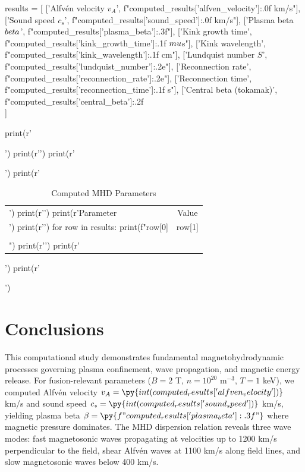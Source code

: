 \documentclass[11pt,a4paper]{article}
\begin{document}
\begin{pycode}
results = [
    ['Alfvén velocity $v_A$', f"{computed_results['alfven_velocity']:.0f} km/s"],
    ['Sound speed $c_s$', f"{computed_results['sound_speed']:.0f} km/s"],
    ['Plasma beta $\\beta$', f"{computed_results['plasma_beta']:.3f}"],
    ['Kink growth time', f"{computed_results['kink_growth_time']:.1f} $\\mu$s"],
    ['Kink wavelength', f"{computed_results['kink_wavelength']:.1f} cm"],
    ['Lundquist number $S$', f"{computed_results['lundquist_number']:.2e}"],
    ['Reconnection rate', f"{computed_results['reconnection_rate']:.2e}"],
    ['Reconnection time', f"{computed_results['reconnection_time']:.1f} s"],
    ['Central beta (tokamak)', f"{computed_results['central_beta']:.2f}\\%
]

print(r'\begin{table}[H]')
print(r'\centering')
print(r'\caption{Computed MHD Parameters}')
print(r'\begin{tabular}{@{}lc@{}}')
print(r'\toprule')
print(r'Parameter & Value \\')
print(r'\midrule')
for row in results:
    print(f"{row[0]} & {row[1]} \\\\")
print(r'\bottomrule')
print(r'\end{tabular}')
print(r'\end{table}')
\end{pycode}

\section{Conclusions}

This computational study demonstrates fundamental magnetohydrodynamic processes governing plasma confinement, wave propagation, and magnetic energy release. For fusion-relevant parameters ($B = 2$ T, $n = 10^{20}$ m$^{-3}$, $T = 1$ keV), we computed Alfvén velocity $v_A = \py{int(computed_results['alfven_velocity'])}$ km/s and sound speed $c_s = \py{int(computed_results['sound_speed'])}$ km/s, yielding plasma beta $\beta = \py{f"{computed_results['plasma_beta']:.3f}"}$ where magnetic pressure dominates. The MHD dispersion relation reveals three wave modes: fast magnetosonic waves propagating at velocities up to 1200 km/s perpendicular to the field, shear Alfvén waves at 1100 km/s along field lines, and slow magnetosonic waves below 400 km/s.
\end{document}
